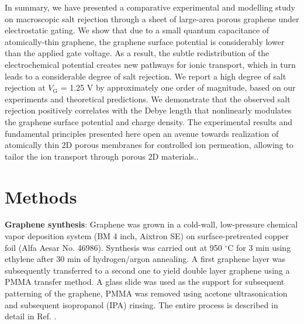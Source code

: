 In summary, we have presented a comparative experimental and modelling
study on macroscopic salt rejection through a sheet of large-area
porous graphene under electrostatic gating. We show that due to a
small quantum capacitance of atomically-thin graphene, the graphene
surface potential is considerably lower than the applied gate
voltage. As a result, the subtle redistribution of the electrochemical
potential creates new pathways for ionic transport, which in turn
leads to a considerable degree of salt rejection. We report a high
degree of salt rejection at $V_{\mathrm{G}}$ = 1.25 V by approximately
one order of magnitude, based on our experiments and theoretical
predictions. We demonstrate that the observed salt
rejection positively correlates with the Debye length that nonlinearly
modulates the graphene surface potential and charge density. The
experimental results and fundamental principles presented here open an
avenue towards realization of atomically thin 2D porous membranes for
{ controlled ion permeation, allowing to tailor the ion transport through porous 2D materials.}.

\section{Methods}
\label{sec:methods}

\textbf{Graphene synthesis}: Graphene was grown in a cold-wall,
low-pressure chemical vapor deposition system (BM 4 inch, Aixtron SE)
on surface-pretreated copper foil (Alfa Aesar No. 46986). Synthesis was
carried out at 950 $^{\circ}$C for 3 min using ethylene after 30 min of
hydrogen/argon annealing. A first graphene layer was subsequently
transferred to a second one to yield double layer graphene using a
PMMA transfer method. A glass slide was used as the support for
subsequent patterning of the graphene, PMMA was removed using acetone
ultrasonication and subsequent isopropanol (IPA) rinsing. The entire
process is described in detail in Ref. \cite{Choi_2018}.

